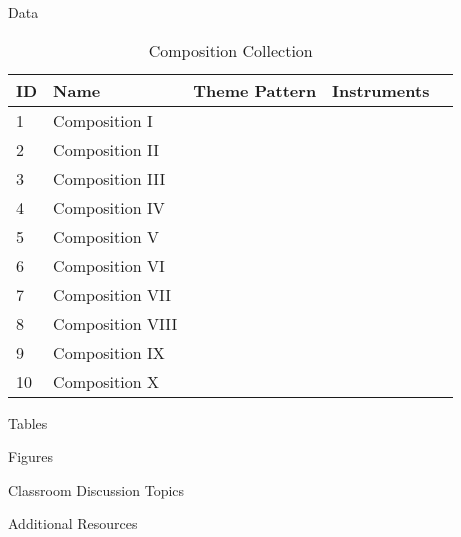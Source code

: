 \begin{frame}[t]
\begin{columns}[t]
\begin{column}{\onecolwid}
\begin{alertblock}{Data}
\begin{table}[H]
\caption{Composition Collection}	
\begin{tabular}{p{1cm}p{4cm}p{2cm}p{1cm}p{1cm}}
\hline
ID & Name & Theme Pattern & Instruments & \\
\hline 
1 & Composition I &  &  & \\
2 & Composition II &  &  & \\
3 & Composition III &  & \\
4 & Composition IV & & \\
5 & Composition V & & & \\
\hline 
6 & Composition VI &  &  & \\
7 & Composition VII &  &  & \\
8 & Composition VIII &  & \\
9 & Composition IX & & \\
10 & Composition X & & & \\
\end{tabular}
\end{table}
\end{alertblock}
\begin{alertblock}{Tables}
\end{alertblock}
\begin{alertblock}{Figures}
\end{alertblock}
\begin{alertblock}{Classroom Discussion Topics}
\end{alertblock}
\begin{alertblock}{Additional Resources}
\begin{enumerate}
\end{enumerate}
\end{alertblock}

\begin{thebibliography}{00}

\end{thebibliography}
\end{column}
\end{columns}
\end{frame}
